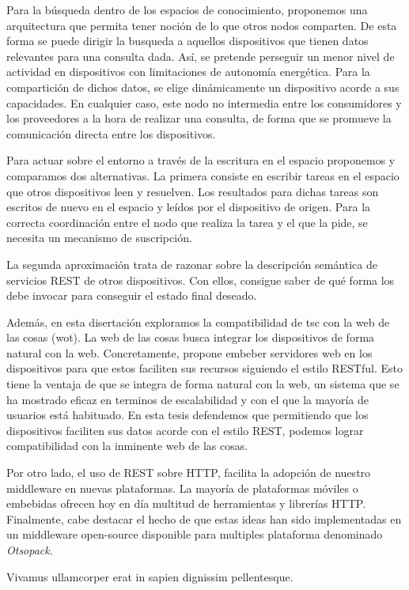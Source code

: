 \begin{resumen}
Para la búsqueda dentro de los espacios de conocimiento, proponemos una arquitectura que permita tener noción de lo que otros nodos comparten.
De esta forma se puede dirigir la busqueda a aquellos dispositivos que tienen datos relevantes para una consulta dada.
Así, se pretende perseguir un menor nivel de actividad en dispositivos con limitaciones de autonomía energética.
Para la compartición de dichos datos, se elige dinámicamente un dispositivo acorde a sus capacidades.
En cualquier caso, este nodo no intermedia entre los consumidores y los proveedores a la hora de realizar una consulta, de forma que se promueve la comunicación directa entre los dispositivos.


Para actuar sobre el entorno a través de la escritura en el espacio proponemos y comparamos dos alternativas.
La primera consiste en escribir tareas en el espacio que otros dispositivos leen y resuelven.
Los resultados para dichas tareas son escritos de nuevo en el espacio y leídos por el dispositivo de origen.
Para la correcta coordinación entre el nodo que realiza la tarea y el que la pide, se necesita un mecanismo de suscripción.


La segunda aproximación trata de razonar sobre la descripción semántica de servicios REST de otros dispositivos.
Con ellos, consigue saber de qué forma los debe invocar para conseguir el estado final deseado.


\bigskip


Además, en esta disertación exploramos la compatibilidad de \ac{tsc} con la web de las cosas (\acs{wot}).
La web de las cosas busca integrar los dispositivos de forma natural con la web.
Concretamente, propone embeber servidores web en los dispositivos para que estos faciliten sus recursos siguiendo el estilo RESTful.
Esto tiene la ventaja de que se integra de forma natural con la web, un sistema que se ha mostrado eficaz en terminos de escalabilidad y con el que la mayoría de usuarios está habituado.
En esta tesis defendemos que permitiendo que los dispositivos faciliten sus datos acorde con el estilo REST, podemos lograr compatibilidad con la inminente web de las cosas.


Por otro lado, el uso de REST sobre HTTP, facilita la adopción de nuestro middleware en nuevas plataformas.
La mayoría de plataformas móviles o embebidas ofrecen hoy en día multitud de herramientas y librerías HTTP.
Finalmente, cabe destacar el hecho de que estas ideas han sido implementadas en un middleware open-source disponible para multiples plataforma denominado \emph{Otsopack}.


\end{resumen}



\begin{laburpena}        %


Vivamus ullamcorper erat in sapien dignissim pellentesque.


\end{laburpena}



